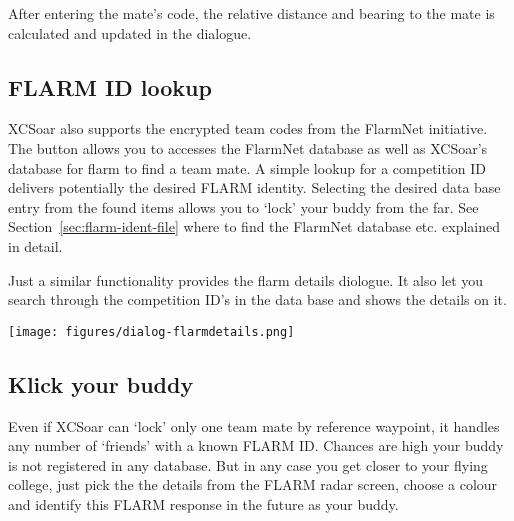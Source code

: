 After entering the mate's code, the relative distance and 
bearing to the mate is calculated and updated in the dialogue.


\subsection*{FLARM ID lookup}

XCSoar also supports the encrypted team codes from the FlarmNet initiative.
The  button allows you to accesses the FlarmNet database as well 
as XCSoar's database for flarm to find a team mate. A simple 
lookup for a competition ID delivers potentially the desired 
FLARM identity. Selecting the desired data base entry from the found items allows you 
to `lock' your buddy from the far. See Section~\ref{sec:flarm-ident-file} 
where to find the FlarmNet database etc. explained in detail.

Just a similar functionality provides the flarm details diologue. It also let 
you search through the competition ID's in the data base and shows the details on it.  

\begin{center}
\texttt{[image: figures/dialog-flarmdetails.png]}
\end{center}


\subsection*{Klick your buddy}
Even if XCSoar can `lock' only one team mate by reference waypoint, 
it handles any number of `friends' with a known FLARM ID. Chances are high your buddy is not
registered in any database. But in any case you get closer to 
your flying college, just pick the the details from the FLARM radar screen, choose 
a colour and identify this FLARM response in the future as your buddy.


